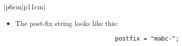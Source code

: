 \begin{center}
\begin{longtable}{ |p{6cm}|p{11cm}| }
\begin{itemize}
                \item The post-fix string looks like this: 
                    {
                        \begin{verbatim}
                            postfix = "mabc-";
                        \end{verbatim}
                    }
            \end{itemize}
            \\
        \hline
        \hline
             \\
        

\end{longtable}
\end{center}
